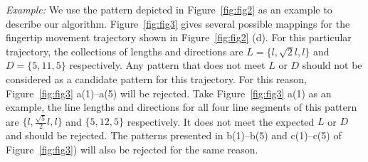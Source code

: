        \noindent \emph{Example:} We use the pattern depicted in Figure~\ref{fig:fig2} as an example to
       describe our algorithm. Figure~\ref{fig:fig3} gives several
       possible mappings for the fingertip movement trajectory shown in Figure~\ref{fig:fig2} (d). For this particular trajectory, the collections of lengths and directions are
       $L=\{l, \sqrt{2}l, l\}$ and $D=\{5, 11, 5\}$ respectively. Any pattern that does not meet $L$ or $D$ should not be considered as a candidate pattern for this trajectory.
       For this reason, Figure~\ref{fig:fig3} a(1)--a(5) will be rejected. Take Figure~\ref{fig:fig3} a(1) as an example,
       the line lengths and directions for all four line segments of this pattern are  $\{l,
       \frac{\sqrt{5}}{2}l, l\}$ and $\{5,12,5\}$ respectively. It does not meet the expected $L$ or $D$ and should be rejected.
       The patterns presented in b(1)--b(5) and c(1)--c(5) of Figure~\ref{fig:fig3}) will
       also be rejected for the same reason.

